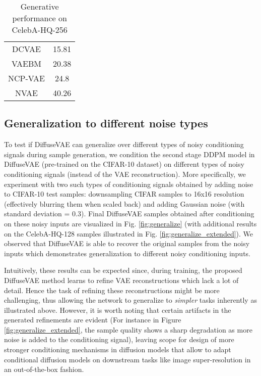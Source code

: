 \documentclass[10pt]{article} \usepackage[accepted]{tmlr}
\begin{document}
\begin{table}[]
\begin{minipage}{0.49\linewidth}
\begin{tabular}{@{}cc@{}}
DCVAE \citep{parmar2021dual}                       & 15.81            \\
VAEBM \citep{xiao2021vaebm}                        & 20.38            \\
NCP-VAE \citep{Aneja2020NCPVAEVA}                     & 24.8             \\
NVAE \citep{vahdat2021nvae}                         & 40.26            \\ \bottomrule
\end{tabular}
\caption{Generative performance on CelebA-HQ-256}
\label{table:celebahq_sota}
\end{minipage}
\end{table}

\subsection{Generalization to different noise types}
\label{sec:generalize}
To test if DiffuseVAE can generalize over different types of noisy conditioning signals during sample generation, we condition the second stage DDPM model in DiffuseVAE (pre-trained on the CIFAR-10 dataset) on different types of noisy conditioning signals (instead of the VAE reconstruction). More specifically, we experiment with two such types of conditioning signals obtained by adding noise to CIFAR-10 test samples: downsampling CIFAR samples to 16x16 resolution (effectively blurring them when scaled back) and adding Gaussian noise (with standard deviation = 0.3). Final DiffuseVAE samples obtained after conditioning on these noisy inputs are visualized in Fig. \ref{fig:generalize} (with additional results on the CelebA-HQ-128 samples illustrated in Fig. \ref{fig:generalize_extended}). We observed that DiffuseVAE is able to recover the original samples from the noisy inputs which demonstrates generalization to different noisy conditioning inputs.

Intuitively, these results can be expected since, during training, the proposed DiffuseVAE method learns to refine VAE reconstructions which lack a lot of detail. Hence the task of refining these reconstructions might be more challenging, thus allowing the network to generalize to \textit{simpler} tasks inherently as illustrated above. However, it is worth noting that certain artifacts in the generated refinements are evident (For instance in Figure \ref{fig:generalize_extended}, the sample quality shows a sharp degradation as more noise is added to the conditioning signal), leaving scope for design of more stronger conditioning mechanisms in diffusion models that allow to adapt conditional diffusion models on downstream tasks like image super-resolution in an out-of-the-box fashion.
\end{document}
